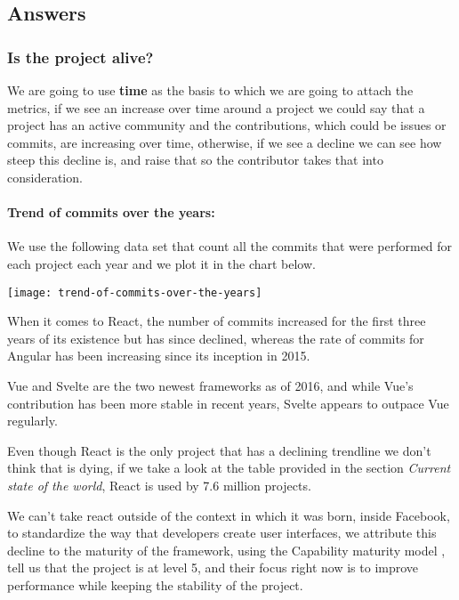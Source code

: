 \subsection{Answers}
\subsubsection{Is the project alive?}
We are going to use \textbf{time} as the basis to which we are going to attach the metrics, if we see an increase over time around a project we could say that a project has an active community and the contributions, which could be issues or commits, are increasing over time, otherwise, if we see a decline we can see how steep this decline is, and raise that so the contributor takes that into consideration.

\paragraph{Trend of commits over the years:} 

We use the following data set \cite{trend-of-commits-over-the-years} that count all the commits that were performed for each project each year and we plot it in the chart below.
\begin{center}
    \texttt{[image: trend-of-commits-over-the-years]}    
\end{center}

When it comes to React, the number of commits increased for the first three years of its existence but has since declined, whereas the rate of commits for Angular has been increasing since its inception in 2015.

Vue and Svelte are the two newest frameworks as of 2016, and while Vue's contribution has been more stable in recent years, Svelte appears to outpace Vue regularly.

Even though React is the only project that has a declining trendline we don't think that is dying, if we take a look at the table provided in the section \textit{Current state of the world}, React is used by 7.6 million projects.

We can't take react outside of the context in which it was born, inside Facebook, to standardize the way that developers create user interfaces, we attribute this decline to the maturity of the framework, using the Capability maturity model \cite{cmm}, tell us that the project is at level 5, and their focus right now is to improve performance while keeping the stability of the project.

